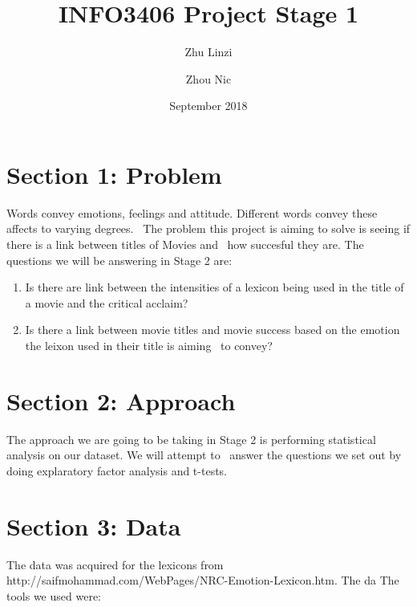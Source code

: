 \documentclass[12pt,a4paper]{article}
\begin{document}
\begin{titlepage}
    \title{INFO3406 Project Stage 1}
    \author{Zhu Linzi\\
            \and
            Zhou Nic
    }
    \date{September 2018}
    \maketitle
\end{titlepage}

    \pagebreak
    \tableofcontents
    \pagebreak

    \section{Section 1: Problem}
    Words convey emotions, feelings and attitude. Different words convey these affects to varying degrees. \
    The problem this project is aiming to solve is seeing if there is a link between titles of Movies and \
    how succesful they are.
    \newline \newline
    The questions we will be answering in Stage 2 are:

    \begin{enumerate}
        \item Is there are link between the intensities of a lexicon being used in the title of a movie and the critical acclaim?
        \item Is there a link between movie titles and movie success based on the emotion the leixon used in their title is aiming \
        to convey?

    \end{enumerate}

    \section{Section 2: Approach}
    The approach we are going to be taking in Stage 2 is performing statistical analysis on our dataset. We will attempt to \
    answer the questions we set out by doing explaratory factor analysis and t-tests.

    \section{Section 3: Data}

    The data was acquired for the lexicons from http://saifmohammad.com/WebPages/NRC-Emotion-Lexicon.htm. The da
    \newline \newline
    The tools we used were:
\end{document}
